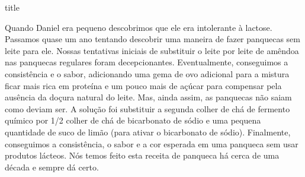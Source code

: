 \documentclass [11pt, letterpaper] {article}
\begin{document}
 {title}


Quando Daniel era pequeno descobrimos que ele era intolerante à
lactose. Passamos quase um ano tentando descobrir uma maneira de fazer
panquecas sem leite para ele. Nossas tentativas iniciais de substituir
o leite por leite de amêndoa nas panquecas regulares foram
decepcionantes. Eventualmente, conseguimos a consistência e o sabor,
adicionando uma gema de ovo adicional para a mistura ficar mais rica
em prote\'ina e um pouco mais de açúcar para compensar pela aus\^encia
da doçura natural do leite. Mas, ainda assim, as panquecas não saiam
como deviam ser. A solução foi substituir a segunda colher de chá de
fermento qu\'imico por 1/2 colher de chá de bicarbonato de sódio e uma
pequena quantidade de suco de limão (para ativar o bicarbonato de
s\'odio). Finalmente, conseguimos a consistência, o sabor e a cor
esperada em uma panqueca sem usar produtos lácteos. Nós temos feito
esta receita de panqueca há cerca de uma década e sempre d\'a certo.
\end{document}
